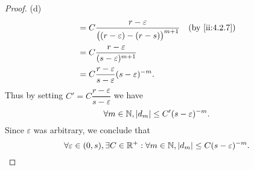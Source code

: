 \begin{proof}{(d)}
\begin{align*}
                                & = C \dfrac{r - \varepsilon}{\big((r - \varepsilon) - (r - s)\big)^{m + 1}}                      &  & \by{ii:4.2.7}               \\
                                & = C \dfrac{r - \varepsilon}{(s - \varepsilon)^{m + 1}}                                                                           \\
                                & = C \dfrac{r - \varepsilon}{s - \varepsilon} (s - \varepsilon)^{-m}.
  \end{align*}
  Thus by setting \(C' = C \dfrac{r - \varepsilon}{s - \varepsilon}\) we have
  \[
    \forall m \in \mathbb{N}, \left\lvert d_m\right\rvert \leq C' (s - \varepsilon)^{-m}.
  \]
  Since \(\varepsilon\) was arbitrary, we conclude that
  \[
    \forall \varepsilon \in (0, s), \exists C \in \mathbb{R}^+ : \forall m \in \mathbb{N}, \left\lvert d_m\right\rvert \leq C (s - \varepsilon)^{-m}.
  \]
\end{proof}

